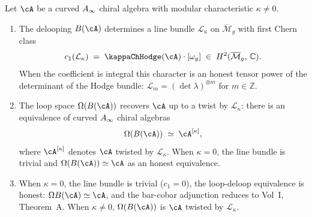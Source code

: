 \begin{proposition}
\label{prop:curved-delooping}
Let\/ $\cA$ be a curved\/ $A_\infty$ chiral algebra with modular
characteristic\/ $\kappa \neq 0$.
\begin{enumerate}[label=\textup{(\roman*)}]
\item The delooping\/ $B(\cA)$ determines a line bundle\/
 $\mathcal{L}_\kappa$ on\/ $\overline{\mathcal M}_g$ with first
 Chern class
 \[
 c_1(\mathcal{L}_\kappa)
 \;=\;
 \kappaChHodge(\cA) \cdot [\omega_g]
 \;\in\;
 H^2(\overline{\mathcal M}_g,\, \mathbb{C}).
 \]
 When the coefficient is integral this character is an honest tensor
 power of the determinant of the Hodge bundle:
 $\mathcal{L}_m = (\det \lambda)^{\otimes m}$ for
 $m \in \mathbb{Z}$.
\item The loop space\/ $\Omega(B(\cA))$ recovers\/ $\cA$ up to a
 twist by\/ $\mathcal{L}_\kappa$: there is an equivalence of
 curved\/ $A_\infty$ chiral algebras
 \[
 \Omega(B(\cA))
 \;\simeq\;
 \cA^{[\kappa]},
 \]
 where\/ $\cA^{[\kappa]}$ denotes\/ $\cA$ twisted by\/
 $\mathcal{L}_\kappa$. When\/ $\kappa = 0$, the line bundle is
 trivial and\/ $\Omega(B(\cA)) \simeq \cA$ as an honest
 equivalence.
\item When\/ $\kappa = 0$, the line bundle is trivial\/
 ($c_1 = 0$), the loop-deloop equivalence is honest:
 $\Omega B(\cA) \simeq \cA$, and the bar-cobar adjunction
 reduces to Vol~I, Theorem~A.
 When\/ $\kappa \neq 0$, $\Omega(B(\cA))$ is\/ $\cA$ twisted
 by\/ $\mathcal{L}_\kappa$.
\end{enumerate}
\end{proposition}

